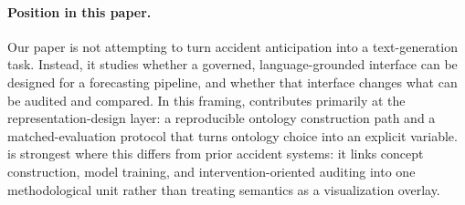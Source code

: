 \paragraph{Position in this paper.}
Our paper is not attempting to turn accident anticipation into a text-generation
task. Instead, it studies whether a governed, language-grounded interface can be
designed for a forecasting pipeline, and whether that interface changes what can
be audited and compared. In this framing, \method{} contributes primarily at the
representation-design layer: a reproducible ontology construction path and a
matched-evaluation protocol that turns ontology choice into an explicit variable.
\method{} is strongest where this differs from prior accident systems: it links
concept construction, model training, and intervention-oriented auditing into one
methodological unit rather than treating semantics as a visualization overlay.
